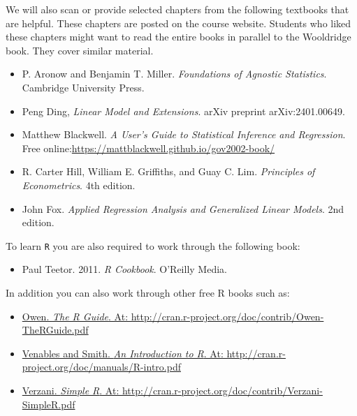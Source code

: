 \documentclass[PS]{syllabus}
\newif\ifrelease
\begin{document}
\begin{syllabus}
We will also scan or provide selected chapters from the following textbooks that are helpful. These chapters are \ifrelease provided to students\else posted on the course website\fi. Students who liked these chapters might want to read the entire books in parallel to the Wooldridge book. They cover similar material.
\begin{itemize}	
\item P. Aronow and Benjamin T. Miller. \emph{Foundations of Agnostic Statistics}. Cambridge University Press.
\item Peng Ding, \emph{Linear Model and Extensions}. arXiv preprint arXiv:2401.00649.
\item Matthew Blackwell. \emph{A User's Guide to Statistical Inference and Regression}. Free online:\newline \url{https://mattblackwell.github.io/gov2002-book/}
\item R. Carter Hill, William E. Griffiths, and Guay C. Lim. \emph{Principles of Econometrics}. 4th edition.
\item John Fox. \emph{Applied Regression Analysis and Generalized Linear Models}. 2nd edition.
\end{itemize}


To learn {\tt R} you are also required to work through the following book:
\begin{itemize}
\item Paul Teetor. 2011. \emph{R Cookbook}. O'Reilly Media.
\end{itemize}


 In addition you can also work through other free R books such as:
\begin{itemize}
\item \href{http://cran.r-project.org/doc/contrib/Owen-TheRGuide.pdf}{Owen. \emph{The R Guide}. At: http://cran.r-project.org/doc/contrib/Owen-TheRGuide.pdf}
\item \href{http://cran.r-project.org/doc/manuals/R-intro.pdf}{Venables and Smith. \emph{An Introduction to R}. At: http://cran.r-project.org/doc/manuals/R-intro.pdf}
\item \href{http://cran.r-project.org/doc/contrib/Verzani-SimpleR.pdf}{Verzani. \emph{Simple R}. At: http://cran.r-project.org/doc/contrib/Verzani-SimpleR.pdf}
\end{itemize}





\end{syllabus}
\end{document}
